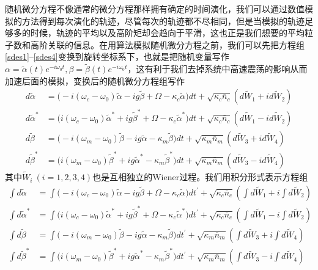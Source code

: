 随机微分方程不像通常的微分方程那样拥有确定的时间演化，我们可以通过数值模拟的方法得到每次演化的轨迹，尽管每次的轨迹都不尽相同，但是当模拟的轨迹足够多的时候，轨迹的平均以及高阶矩却会趋向于平滑，这也正是我们想要的平均粒子数和高阶关联的信息。在用算法模拟随机微分方程之前，我们可以先把方程组\eqref{sdes1}--\eqref{sdes4}变换到旋转坐标系下，也就是把随机变量写作$\alpha=\tilde{\alpha}(t) e^{-i\omega_{0}t}, \beta=\tilde{\beta}(t) e^{-i\omega_{0}t}$，这有利于我们去掉系统中高速震荡的影响从而加速后面的模拟，变换后的随机微分方程组写作
\begin{align}
d{\tilde{\alpha}}&=\big(-i(\omega_{c}-\omega_{0})\tilde{\alpha}-ig\tilde{\beta}+\Omega -\kappa_{c}\tilde{\alpha}\big)dt+\sqrt{\kappa_c\overline{n}_{c}}(d\tilde{W}_1+id\tilde{W}_2) \label{RotateSDEs1} \\
d{\tilde{\alpha}^{*}}&=\big(i(\omega_{c}-\omega_{0})\tilde{\alpha}^{*}+ig\tilde{\beta}^{*}+\Omega -\kappa_{c}\tilde{\alpha}^{*}\big)dt+\sqrt{\kappa_c\overline{n}_{c}}(d\tilde{W}_1-id\tilde{W}_2) \\
d{\tilde{\beta}}&=\big(-i(\omega_{m}-\omega_{0})\tilde{\beta}-ig\tilde{\alpha}-\kappa_{m}\tilde{\beta}\big)dt+\sqrt{\kappa_m\overline{n}_{m}}(d\tilde{W}_3+id\tilde{W}_4) \\
d{\tilde{\beta}^{*}}&=\big(i(\omega_{m}-\omega_{0})\tilde{\beta}^{*}+ig\tilde{\alpha}^{*}-\kappa_{m}\tilde{\beta}^{*}\big)dt+\sqrt{\kappa_m\overline{n}_{m}}(d\tilde{W}_3-id\tilde{W}_4) \label{RotateSDEs4}
\end{align}
其中$\tilde{W}_i~(i=1,2,3,4)$也是互相独立的Wiener过程。我们用积分形式表示方程组
\begin{equation}
\begin{aligned}
\int d{\tilde{\alpha}}&=\int \big(-i(\omega_{c}-\omega_{0})\tilde{\alpha}-ig\tilde{\beta}+\Omega -\kappa_{c}\tilde{\alpha}\big)dt^{\prime}+\sqrt{\kappa_c\overline{n}_{c}}(\int d\tilde{W}_1+i\int d\tilde{W}_2) \\
\int d{\tilde{\alpha}^{*}}&=\int \big(i(\omega_{c}-\omega_{0})\tilde{\alpha}^{*}+ig\tilde{\beta}^{*}+\Omega -\kappa_{c}\tilde{\alpha}^{*}\big)dt^{\prime}+\sqrt{\kappa_c\overline{n}_{c}}(\int d\tilde{W}_1-i\int d\tilde{W}_2) \\
\int d{\tilde{\beta}}&=\int \big(-i(\omega_{m}-\omega_{0})\tilde{\beta}-ig\tilde{\alpha}-\kappa_{m}\tilde{\beta}\big)dt^{\prime}+\sqrt{\kappa_m\overline{n}_{m}}(\int d\tilde{W}_3+i\int d\tilde{W}_4) \\
\int d{\tilde{\beta}^{*}}&=\int \big(i(\omega_{m}-\omega_{0})\tilde{\beta}^{*}+ig\tilde{\alpha}^{*}-\kappa_{m}\tilde{\beta}^{*}\big)dt^{\prime}+\sqrt{\kappa_m\overline{n}_{m}}(\int d\tilde{W}_3-i\int d\tilde{W}_4)
\end{aligned}
\end{equation}
